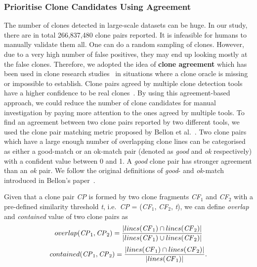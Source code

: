 \documentclass[sigconf,review, anonymous]{acmart}
\newcommand{\squeezeup}{\vspace{-0.5mm}}
\begin{document}
\subsubsection{Prioritise Clone Candidates Using Agreement}
The number of clones detected in large-scale datasets can be huge. In our study, there are in total 266,837,480 clone pairs reported. It is infeasible for humans to manually validate them all. One can do a random sampling of clones. However, due to a very high number of false positives, they may end up looking mostly at the false clones. Therefore, we adopted the idea of \textbf{clone agreement} which has been used in clone research studies~\cite{Wang2013,Funaro2010,cr2016ssbse} in situations where a clone oracle is missing or impossible to establish. Clone pairs agreed by multiple clone detection tools have a higher confidence to be real clones~\cite{cr2016ssbse}. By using this agreement-based approach, we could reduce the number of clone candidates for manual investigation by paying more attention to the ones agreed by multiple tools. To find an agreement between two clone pairs reported by two different tools, we used the clone pair matching metric proposed by Bellon et al.~\cite{Bellon2007}. Two clone pairs which have a large enough number of overlapping clone lines can be categorised as either a good-match or an ok-match pair (denoted as \textit{good} and \textit{ok} respectively) with a confident value between 0 and 1. A \textit{good} clone pair has stronger agreement than an \textit{ok} pair. We follow the original definitions of \textit{good}- and \textit{ok}-match introduced in Bellon's paper~\cite{Bellon2007}.

\vspace{0.5ex}
Given that a clone pair \textit{CP} is formed by two clone fragments \textit{CF$_1$} and \textit{CF$_2$} with a pre-defined similarity threshold \textit{t}, i.e.~\textit{CP} = (\textit{CF$_1$}, \textit{CF$_2$}, \textit{t}), we can define \textit{overlap} and \textit{contained} value of two clone pairs as 
\begin{multline}
	overlap(\textrm{\textit{CP}}_1, \textrm{\textit{CP}}_2) = \frac{|lines(\textrm{\textit{CF}}_1) \cap lines(\textrm{\textit{CF}}_2)|}{|lines(\textrm{\textit{CF}}_1) \cup lines(\textrm{\textit{CF}}_2)|} 
\end{multline}
\begin{multline}
	contained(\textrm{\textit{CP}}_1, \textrm{\textit{CP}}_2) = \frac{|lines(\textrm{\textit{CF}}_1) \cap lines(\textrm{\textit{CF}}_2)|}{|lines(\textrm{\textit{CF}}_1)|}. 
\end{multline}
\end{document}
